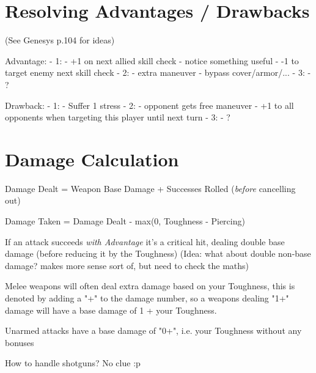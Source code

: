 \section{Resolving Advantages / Drawbacks}

(See Genesys p.104 for ideas)

Advantage:
    - 1:
        - +1 on next allied skill check
        - notice something useful
        - -1 to target enemy next skill check
    - 2:
        - extra maneuver
        - bypass cover/armor/...
    - 3:
        - ?

Drawback:
  - 1:
      - Suffer 1 stress
  - 2:
      - opponent gets free maneuver
      - +1 to all opponents when targeting this player until next turn
  - 3:
      - ?
  


\section{Damage Calculation}

Damage Dealt = Weapon Base Damage + Successes Rolled (\textit{before} cancelling out)

Damage Taken = Damage Dealt - max(0, Toughness - Piercing) 

If an attack succeeds \textit{with Advantage} it's a critical hit, dealing double base damage (before reducing it by the Toughness)
(Idea: what about double non-base damage? makes more sense sort of, but need to check the maths)

Melee weapons will often deal extra damage based on your Toughness, this is denoted by adding a "+" to the damage number, so a weapons dealing "1+" damage will have a base damage of 1 + your Toughness.

Unarmed attacks have a base damage of "0+", i.e. your Toughness without any bonuses


How to handle shotguns? No clue :p


